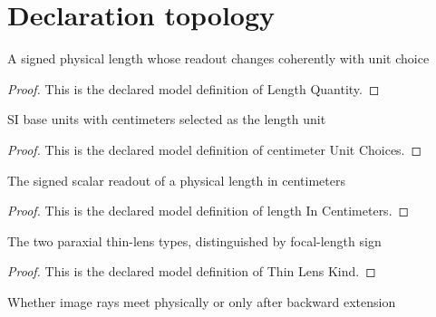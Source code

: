 \section{Declaration topology}
\begin{definition}
  \label{def:physics:phyx-mini-0053:phyxminiproblems-problemphyxmini0053-lengthquantity}
  A signed physical length whose readout changes coherently with unit choice
\end{definition}
\begin{proof}
  This is the declared model definition of Length Quantity.
\end{proof}
\begin{definition}
  \label{def:physics:phyx-mini-0053:phyxminiproblems-problemphyxmini0053-centimeterunitchoices}
  SI base units with centimeters selected as the length unit
\end{definition}
\begin{proof}
  This is the declared model definition of centimeter Unit Choices.
\end{proof}
\begin{definition}
  \label{def:physics:phyx-mini-0053:phyxminiproblems-problemphyxmini0053-lengthincentimeters}
  The signed scalar readout of a physical length in centimeters
\end{definition}
\begin{proof}
  This is the declared model definition of length In Centimeters.
\end{proof}
\begin{definition}
  \label{def:physics:phyx-mini-0053:phyxminiproblems-problemphyxmini0053-thinlenskind}
  The two paraxial thin-lens types, distinguished by focal-length sign
\end{definition}
\begin{proof}
  This is the declared model definition of Thin Lens Kind.
\end{proof}
\begin{definition}
  \label{def:physics:phyx-mini-0053:phyxminiproblems-problemphyxmini0053-geometricalimagekind}
  Whether image rays meet physically or only after backward extension
\end{definition}
